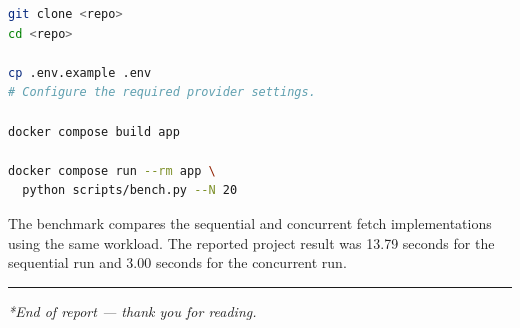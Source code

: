 \documentclass[11pt,a4paper]{article}
\begin{document}
\begin{lstlisting}[style=python,language=bash,numbers=none]
git clone <repo>
cd <repo>

cp .env.example .env
# Configure the required provider settings.

docker compose build app

docker compose run --rm app \
  python scripts/bench.py --N 20
\end{lstlisting}

The benchmark compares the sequential and concurrent fetch implementations using the same workload. The reported project result was 13.79 seconds for the sequential run and 3.00 seconds for the concurrent run.

\vspace{1em}
\hrule
\vspace{0.6em}

\noindent
\small\textit{*End of report --- thank you for reading.}
\end{document}
